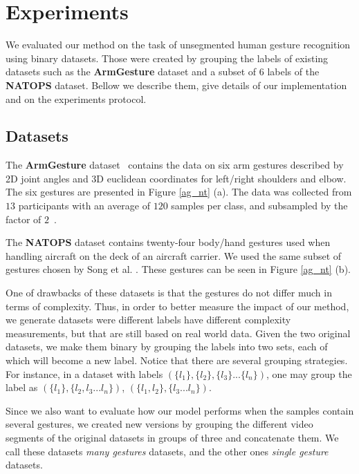 \documentclass[10pt, conference]{IEEEtran}
\begin{document}
\section{Experiments}
\label{experiments}

We evaluated our method on the task of unsegmented human gesture recognition using binary datasets. Those were created by grouping the labels of existing datasets such as the \textbf{ArmGesture} dataset and a subset of $6$ labels of the \textbf{NATOPS} dataset. Bellow we describe them, give details of our implementation and on the experiments protocol.

\subsection{Datasets}

The \textbf{ArmGesture} dataset~\cite{quattoni2007hidden} contains the data on six arm gestures described by 2D joint angles and 3D euclidean coordinates for left/right shoulders and elbow. The six gestures are presented in Figure \ref{ag_nt} (a). The data was collected from $13$ participants with an average of $120$ samples per class, and subsampled by the factor of $2$~\cite{mvldcrf}. 

The \textbf{NATOPS} dataset \cite{song2011tracking} contains twenty-four body/hand gestures used when handling aircraft on the deck of an aircraft carrier. We used the same subset of gestures chosen by Song et al. \cite{mvldcrf}. These gestures can be seen in Figure \ref{ag_nt} (b).

One of drawbacks of these datasets is that the gestures do not differ  much in terms of complexity. Thus, in order to better measure the impact of our method, we generate datasets were different labels have different complexity measurements, but that are still based on real world data. Given the two original datasets, we make them binary by grouping the labels into two sets, each of which will become a new label. 
Notice that there are several grouping strategies. For instance, in a dataset with labels $(\{l_1\},\{l_2\},\{l_3\}...\{l_n\})$, one may group the label as $(\{l_1\},\{l_2,l_3...l_n\})$, $(\{l_1, l_2\},\{l_3...l_n\})$. 

Since we also want to evaluate how our model performs when the samples contain several gestures, we created new versions by grouping the different video segments of the original datasets in groups of three and concatenate them. We call these datasets \textit{many gestures} datasets, and the other ones \textit{single gesture} datasets.
\end{document}

